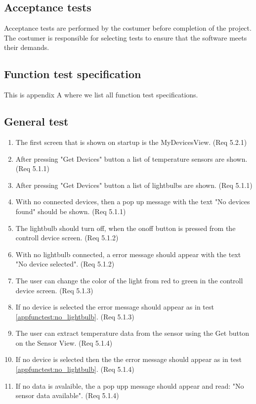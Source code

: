 \documentclass[a4paper]{article}
\newlength{\testlabellength}
\newenvironment{testlist}{\begin{enumerate}[label=\bfseries Test \thesubsection.\arabic* , labelindent=0pt, labelwidth=\testlabellength , leftmargin=2cm]}{\end{enumerate}}
\begin{document}
\subsection{Acceptance tests}
Acceptance tests are performed by the costumer before completion of the project. The costumer is responsible for selecting tests to ensure that the software meets their demands.

\newpage
\begin{appendices}

\section{Function test specification} \label{appendix:section:functiontest}
This is appendix A where we list all function test specifications.

\subsection{General test}
%
%

\begin{testlist}
	\item The first screen that is shown on startup is the MyDevicesView. (Req 5.2.1)
	\item After pressing "Get Devices" button a list of temperature sensors are shown. (Req 5.1.1)
	\item After pressing "Get Devices" button a list of lightbulbs are shown. (Req 5.1.1)
    \item With no connected devices, then a pop up message with the text "No devices found" should be shown. (Req 5.1.1)
	\item The lightbulb should turn off, when the onoff button is pressed from the controll device screen. (Req 5.1.2)
    \item With no lightbulb connected, a error message should appear with the text "No device selected". (Req 5.1.2) \label{appfunctest:no_lightbulb}
    \item The user can change the color of the light from red to green in the controll device screen. (Req 5.1.3)
    \item If no device is selected the error message should appear as in test \ref{appfunctest:no_lightbulb}. (Req 5.1.3)
    \item The user can extract temperature data from the sensor using the Get button on the Sensor View. (Req 5.1.4)
    \item If no device is selected then the the error message should appear as in test \ref{appfunctest:no_lightbulb}. (Req 5.1.4)
    \item If no data is avalaible, the a pop upp message should appear and read: "No sensor data available". (Req 5.1.4)
\end{testlist}


\end{appendices}
\end{document}
